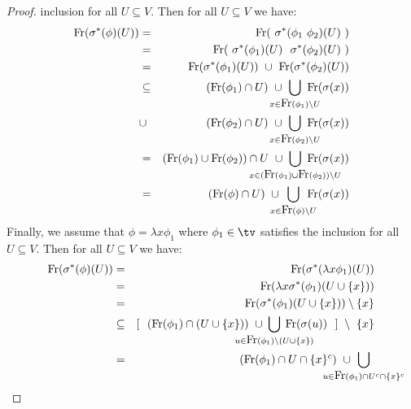 \begin{proof}
inclusion for all $U\subseteq V$. Then for all $U\subseteq V$ we have:
    \begin{eqnarray*}
        \free(\sigma^{*}(\phi)(U))
        &=&\free(\ \sigma^{*}(\phi_{1}\ \phi_{2})(U)\ )\\
        &=&\free(\ \sigma^{*}(\phi_{1})(U)\ \ \sigma^{*}(\phi_{2})(U)\ )\\
        &=&\free(\sigma^{*}(\phi_{1})(U))\ \cup\ \free(\sigma^{*}(\phi_{2})(U))\\
        &\subseteq&(\free(\phi_{1})\cap U)
        \ \cup\ 
        \!\!\!\!\!\!\!\!\!\!
        \bigcup_{x\in\free(\phi_{1})\setminus U}
        \!\!\!\!\!\!\!\!
        \free(\sigma(x))\\
        &\cup&(\free(\phi_{2})\cap U)
        \ \cup\ 
        \!\!\!\!\!\!\!\!\!\!
        \bigcup_{x\in\free(\phi_{2})\setminus U}
        \!\!\!\!\!\!\!\!
        \free(\sigma(x))\\
        &=&(\free(\phi_{1})\cup\free(\phi_{2}))\cap U
        \ \cup\ 
        \!\!\!\!\!\!\!\!\!\!\!\!\!\!\!\!\!\!\!\!\!
        \bigcup_{x\in(\free(\phi_{1})\cup\free(\phi_{2}))\setminus U}
        \!\!\!\!\!\!\!\!\!\!\!\!\!\!\!\!\!\!\!
        \free(\sigma(x))\\
        &=&(\free(\phi)\cap U)
        \ \cup\ 
        \!\!\!\!\!\!\!\!
        \bigcup_{x\in\free(\phi)\setminus U}
        \!\!\!\!\!\!
        \free(\sigma(x))
    \end{eqnarray*}
Finally, we assume that $\phi=\lambda x\phi_{1}$ where $\phi_{1}\in\tv$ 
satisfies the inclusion for all $U\subseteq V$. Then for all $U\subseteq V$ 
we have:
    \begin{eqnarray*}
        \free(\sigma^{*}(\phi)(U))
        &=&\free(\sigma^{*}(\lambda x\phi_{1})(U))\\
        &=&\free(\lambda x\sigma^{*}(\phi_{1})(U\cup\{x\}))\\
        &=&\free(\sigma^{*}(\phi_{1})(U\cup\{x\}))\setminus\{x\}\\
        &\subseteq& [\ \ (\free(\phi_{1})\cap(U\cup\{x\}))
            \ \cup
            \!\!\!\!\!\!\!\!\!\!\!\!\!\!\!\!
            \bigcup_{u\in\free(\phi_{1})\setminus(U\cup\{x\})}
            \!\!\!\!\!\!\!\!\!\!\!\!\!\!\!\!
            \free(\sigma(u))
             \ \ ]\ \setminus\ \{x\}\\
        &=&(\free(\phi_{1})\cap U\cap \{x\}^{c})
            \ \cup
            \!\!\!\!\!\!\!\!\!\!\!\!\!\!\!\!
            \bigcup_{u\in\free(\phi_{1})\cap U^{c}\cap\{x\}^{c}}
            \!\!\!\!\!\!\!\!\!\!\!\!\!\!\!\!

\end{eqnarray*}
\end{proof}
